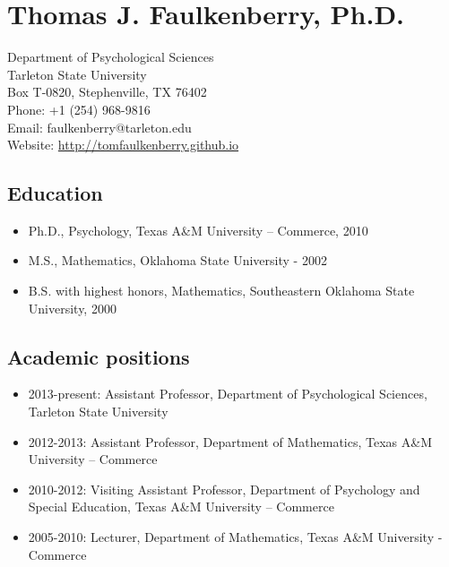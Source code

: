 \documentclass[article,10pt]{article}
\date{\today}
\title{}
\begin{document}
\section*{Thomas J. Faulkenberry, Ph.D.}
\label{sec:org80d9d8f}

Department of Psychological Sciences\\
Tarleton State University\\
Box T-0820, Stephenville, TX 76402\\
Phone: +1 (254) 968-9816\\
Email: faulkenberry@tarleton.edu\\
Website: \url{http://tomfaulkenberry.github.io}

\subsection*{Education}
\label{sec:org7e94794}
\begin{itemize}
\item Ph.D., Psychology, Texas A\&M University – Commerce, 2010
\item M.S., Mathematics, Oklahoma State University - 2002
\item B.S. with highest honors, Mathematics, Southeastern Oklahoma State University, 2000
\end{itemize}

\subsection*{Academic positions}
\label{sec:org03fd57f}
\begin{itemize}
\item 2013-present: Assistant Professor, Department of Psychological Sciences, Tarleton State University
\item 2012-2013: Assistant Professor, Department of Mathematics, Texas A\&M University – Commerce
\item 2010-2012: Visiting Assistant Professor, Department of Psychology and Special Education, Texas A\&M University – Commerce
\item 2005-2010: Lecturer, Department of Mathematics, Texas A\&M University - Commerce
\end{itemize}
\end{document}
